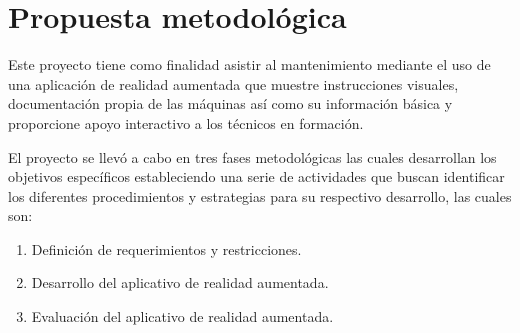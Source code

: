 \section{Propuesta metodológica}

    Este proyecto tiene como finalidad asistir al mantenimiento mediante el uso de una aplicación de realidad aumentada que muestre instrucciones visuales, documentación propia de las máquinas así como su información básica y proporcione apoyo interactivo a los técnicos en formación.

    El proyecto se llevó a cabo en tres fases metodológicas las cuales desarrollan los objetivos específicos estableciendo una serie de actividades que buscan identificar los diferentes procedimientos y estrategias para su respectivo desarrollo, las cuales son:

    \begin{enumerate}

        \item Definición de requerimientos y restricciones.

        \item Desarrollo del aplicativo de realidad aumentada.
        
        \item Evaluación del aplicativo de realidad aumentada.
        
    \end{enumerate}